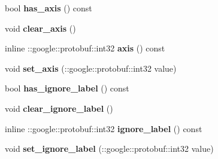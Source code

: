 \begin{DoxyCompactItemize}
bool {\bfseries has\+\_\+axis} () const
\item 
\mbox{\label{classcaffe_1_1_accuracy_parameter_a95eca7283e9b348e3d56ce6072f62393}} 
void {\bfseries clear\+\_\+axis} ()
\item 
\mbox{\label{classcaffe_1_1_accuracy_parameter_a4b9231676c5d221cbd647455f887b91a}} 
inline \+::google\+::protobuf\+::int32 {\bfseries axis} () const
\item 
\mbox{\label{classcaffe_1_1_accuracy_parameter_a0f542225dcb4daf0f9a242bcffa10fb8}} 
void {\bfseries set\+\_\+axis} (\+::google\+::protobuf\+::int32 value)
\item 
\mbox{\label{classcaffe_1_1_accuracy_parameter_a9eaf83ec6f7c896ca6c3c1635bce2a9c}} 
bool {\bfseries has\+\_\+ignore\+\_\+label} () const
\item 
\mbox{\label{classcaffe_1_1_accuracy_parameter_a8a65d59e56d203eaa0f9eca95a6e6047}} 
void {\bfseries clear\+\_\+ignore\+\_\+label} ()
\item 
\mbox{\label{classcaffe_1_1_accuracy_parameter_a16947ae71e97c3c294d74a690a594d09}} 
inline \+::google\+::protobuf\+::int32 {\bfseries ignore\+\_\+label} () const
\item 
\mbox{\label{classcaffe_1_1_accuracy_parameter_ad717ca695cbf95e5a41787a14a4b5377}} 
void {\bfseries set\+\_\+ignore\+\_\+label} (\+::google\+::protobuf\+::int32 value)
\end{DoxyCompactItemize}
